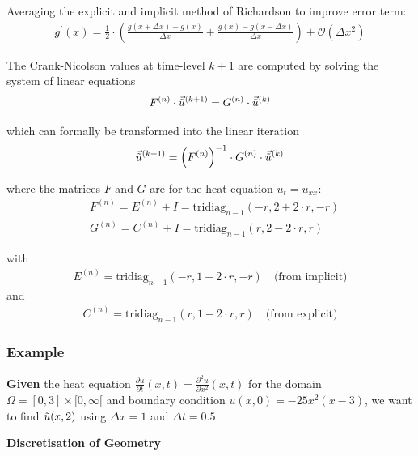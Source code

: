 
Averaging the explicit and implicit method of Richardson to improve error term:
\begin{align*}
	g^{\prime}(x)={\frac{1}{2}}\cdot\left({\frac{g(x+\Delta x)-g(x)}{\Delta x}}+{\frac{g(x)-g(x-\Delta x)}{\Delta x}}\right)
	+ \mathcal{O}(\Delta x^{2})
\end{align*}

The Crank-Nicolson values at time-level $k+1$ are computed by solving the system of linear equations
\begin{align*}
	F^{(n)}\cdot\vec{\tilde{u}}^{(k+1)} = G^{(n)}\cdot\vec{\tilde{u}}^{(k)}
\end{align*}

which can formally be transformed into the linear iteration
\begin{align*}
	\vec{\tilde{u}}^{(k+1)}=\left(F^{(n)}\right)^{-1}\cdot G^{(n)}\cdot\vec{\tilde{u}}^{(k)}
\end{align*}

where the matrices $F$ and $G$ are for the heat equation $u_t=u_{xx}$:
\begin{align*}
	& F^{(n)}=E^{(n)}+I=\mathrm{tridiag}_{n-1}(-r,2+2\cdot r,-r) \\
	& G^{(n)}=C^{(n)}+I=\mathrm{tridiag}_{n-1}(r,2-2\cdot r,r)
\end{align*}

with
\begin{align*}
	E^{(n)}=\mathrm{tridiag}_{n-1}(-r,1+2\cdot r,-r)	\quad\text{(from implicit)}
\end{align*}
and
\begin{align*}
	C^{(n)}=\mathrm{tridiag}_{n-1}(r,1-2\cdot r,r)\quad\text{(from explicit)}
\end{align*}

\subsubsection{Example}

\textbf{Given} the heat equation $\frac{\partial u}{\partial t}(x,t) = \frac{\partial^2 u}{\partial x^2}(x,t)$
for the domain $\Omega = [0,3]\times [0, \infty[$ and boundary condition
$u(x,0) = -25x^2(x-3)$, we want to find $\tilde{u}(x,2)$ using $\Delta x = 1$ and $\Delta t = 0.5$.

\textbf{Discretisation of Geometry}


